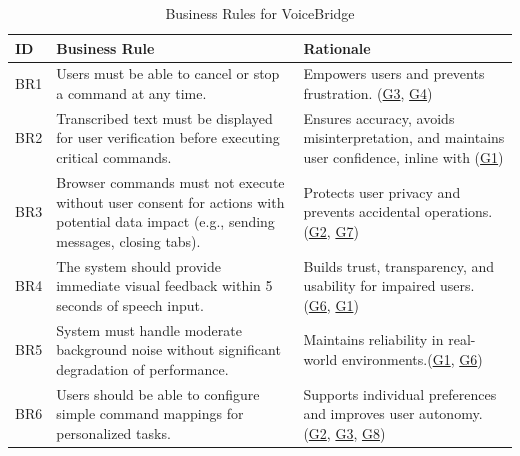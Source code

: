 \documentclass[12pt]{article}
\begin{document}
\begin{table}[H]
\centering
\begin{tabularx}{\textwidth}{p{1cm} X X}
\toprule
\textbf{ID} & \textbf{Business Rule} & \textbf{Rationale} \\
\midrule
BR1 & Users must be able to cancel or stop a command at any time. & Empowers users and prevents frustration. (\hyperref[tab:project-goals]{G3}, \hyperref[tab:project-goals]{G4}) \\
BR2 & Transcribed text must be displayed for user verification before executing critical commands. & Ensures accuracy, avoids misinterpretation, and maintains user confidence, inline with (\hyperref[tab:project-goals]{G1}) \\
BR3 & Browser commands must not execute without user consent for actions with potential data impact (e.g., sending messages, closing tabs). & Protects user privacy and prevents accidental operations. (\hyperref[tab:project-goals]{G2}, \hyperref[tab:project-goals]{G7}) \\
BR4 & The system should provide immediate visual feedback within 5 seconds of speech input. & Builds trust, transparency, and usability for impaired users. (\hyperref[tab:project-goals]{G6}, \hyperref[tab:project-goals]{G1}) \\
BR5 & System must handle moderate background noise without significant degradation of performance. & Maintains reliability in real-world environments.(\hyperref[tab:project-goals]{G1}, \hyperref[tab:project-goals]{G6}) \\
BR6 & Users should be able to configure simple command mappings for personalized tasks. & Supports individual preferences and improves user autonomy. (\hyperref[tab:project-goals]{G2}, \hyperref[tab:project-goals]{G3}, \hyperref[tab:project-goals]{G8}) \\
\bottomrule
\end{tabularx}
\caption{Business Rules for VoiceBridge}
\label{tab:business-rules}
\end{table}
\end{document}
